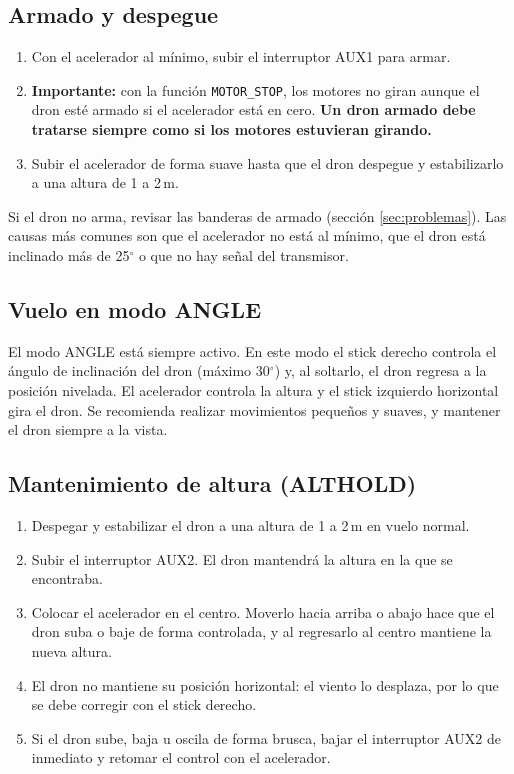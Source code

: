 \documentclass[pdflatex,sn-mathphys-num]{sn-jnl}%
\begin{document}
\subsection{Armado y despegue}
\begin{enumerate}[nosep]
    \item Con el acelerador al mínimo, subir el interruptor AUX1 para armar.
    \item \textbf{Importante:} con la función \texttt{MOTOR\_STOP}, los motores no giran aunque el dron esté armado si el acelerador está en cero. \textbf{Un dron armado debe tratarse siempre como si los motores estuvieran girando.}
    \item Subir el acelerador de forma suave hasta que el dron despegue y estabilizarlo a una altura de 1 a 2\,m.
\end{enumerate}
Si el dron no arma, revisar las banderas de armado (sección \ref{sec:problemas}). Las causas más comunes son que el acelerador no está al mínimo, que el dron está inclinado más de 25$^{\circ}$ o que no hay señal del transmisor.

\subsection{Vuelo en modo ANGLE}
El modo ANGLE está siempre activo. En este modo el stick derecho controla el ángulo de inclinación del dron (máximo 30$^{\circ}$) y, al soltarlo, el dron regresa a la posición nivelada. El acelerador controla la altura y el stick izquierdo horizontal gira el dron. Se recomienda realizar movimientos pequeños y suaves, y mantener el dron siempre a la vista.

\subsection{Mantenimiento de altura (ALTHOLD)}
\begin{enumerate}[nosep]
    \item Despegar y estabilizar el dron a una altura de 1 a 2\,m en vuelo normal.
    \item Subir el interruptor AUX2. El dron mantendrá la altura en la que se encontraba.
    \item Colocar el acelerador en el centro. Moverlo hacia arriba o abajo hace que el dron suba o baje de forma controlada, y al regresarlo al centro mantiene la nueva altura.
    \item El dron no mantiene su posición horizontal: el viento lo desplaza, por lo que se debe corregir con el stick derecho.
    \item Si el dron sube, baja u oscila de forma brusca, bajar el interruptor AUX2 de inmediato y retomar el control con el acelerador.
\end{enumerate}
\end{document}
